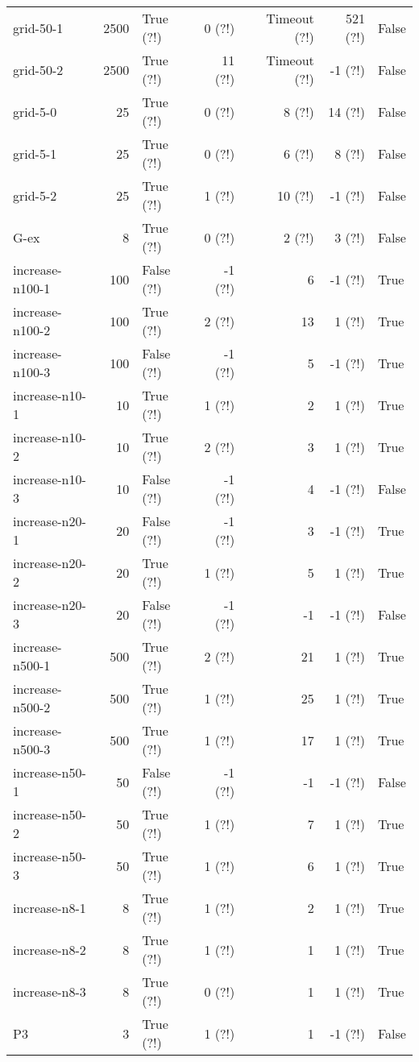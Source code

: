 \begin{longtable}{lrlrrrl}
grid-50-1 & 2500 & True (?!) & 0 (?!) & Timeout (?!) & 521 (?!) & False \\
grid-50-2 & 2500 & True (?!) & 11 (?!) & Timeout (?!) & -1 (?!) & False \\
grid-5-0 & 25 & True (?!) & 0 (?!) & 8 (?!) & 14 (?!) & False \\
grid-5-1 & 25 & True (?!) & 0 (?!) & 6 (?!) & 8 (?!) & False \\
grid-5-2 & 25 & True (?!) & 1 (?!) & 10 (?!) & -1 (?!) & False \\
G-ex & 8 & True (?!) & 0 (?!) & 2 (?!) & 3 (?!) & False \\
increase-n100-1 & 100 & False (?!) & -1 (?!) & 6 & -1 (?!) & True \\
increase-n100-2 & 100 & True (?!) & 2 (?!) & 13 & 1 (?!) & True \\
increase-n100-3 & 100 & False (?!) & -1 (?!) & 5 & -1 (?!) & True \\
increase-n10-1 & 10 & True (?!) & 1 (?!) & 2 & 1 (?!) & True \\
increase-n10-2 & 10 & True (?!) & 2 (?!) & 3 & 1 (?!) & True \\
increase-n10-3 & 10 & False (?!) & -1 (?!) & 4 & -1 (?!) & False \\
increase-n20-1 & 20 & False (?!) & -1 (?!) & 3 & -1 (?!) & True \\
increase-n20-2 & 20 & True (?!) & 1 (?!) & 5 & 1 (?!) & True \\
increase-n20-3 & 20 & False (?!) & -1 (?!) & -1 & -1 (?!) & False \\
increase-n500-1 & 500 & True (?!) & 2 (?!) & 21 & 1 (?!) & True \\
increase-n500-2 & 500 & True (?!) & 1 (?!) & 25 & 1 (?!) & True \\
increase-n500-3 & 500 & True (?!) & 1 (?!) & 17 & 1 (?!) & True \\
increase-n50-1 & 50 & False (?!) & -1 (?!) & -1 & -1 (?!) & False \\
increase-n50-2 & 50 & True (?!) & 1 (?!) & 7 & 1 (?!) & True \\
increase-n50-3 & 50 & True (?!) & 1 (?!) & 6 & 1 (?!) & True \\
increase-n8-1 & 8 & True (?!) & 1 (?!) & 2 & 1 (?!) & True \\
increase-n8-2 & 8 & True (?!) & 1 (?!) & 1 & 1 (?!) & True \\
increase-n8-3 & 8 & True (?!) & 0 (?!) & 1 & 1 (?!) & True \\
P3 & 3 & True (?!) & 1 (?!) & 1 & -1 (?!) & False \\

\end{longtable}
